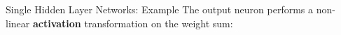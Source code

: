 \begin{frame} {Single Hidden Layer Networks: Example}
The output neuron performs a non-linear \textbf{activation} transformation on the weight sum:
\begin{figure}
\centering
{}
\end{figure}
\end{frame}

